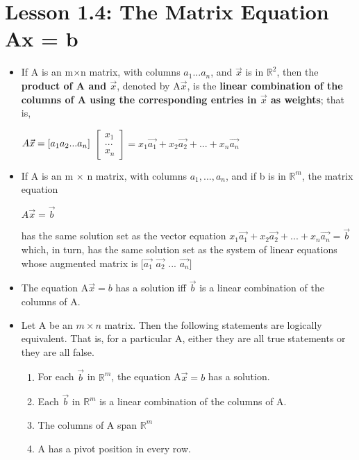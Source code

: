 \documentclass{report}
\begin{document}
\section{Lesson 1.4: The Matrix Equation Ax = b}
	\begin{itemize}\addtolength{\leftskip}{2em}
		\item If A is an m$\times$n matrix, with columns $a_{1}...a_{n}$, and $\vec{x}$ is in $\mathbb{R}^2$, then the \textbf{product of A and $\vec{x}$}, denoted by A$\vec{x}$, is the \textbf{linear combination of the columns of A using the corresponding entries in $\vec{x}$ as  weights}; that is, \linebreak \begin{center}$A\vec{x} = [a_{1} \space a_{2} \space ... \space a_{n}]$
		$\begin{bmatrix} x_1 \\ ... \\ x_n \end{bmatrix} = x_{1}\vec{a_{1}}+x_{2}\vec{a_{2}}+...+x_{n}\vec{a_{n}}$\end{center}
		\item If A is an m $\times$ n matrix, with columns $a_{1},...,a_{n}$, and if b is in $\mathbb{R}^{m}$, the matrix equation
		\begin{center}
		$A\vec{x}=\vec{b}$
		\end{center}
		has the same solution set as the vector equation $x_{1}\vec{a_{1}}+x_{2}\vec{a_{2}}+...+x_{n}\vec{a_{n}}=\vec{b}$
		which, in turn, has the same solution set as the system of linear equations whose augmented matrix is $[\vec{a_1}$ $\vec{a_2}$ ... $\vec{a_n}]$
		\item The equation A$\vec{x}=b$ has a solution iff $\vec{b}$ is a linear combination of the columns of A.
		\item Let A be an $m\times n$ matrix. Then the following statements are logically equivalent. That is, for a particular A, either they are all true statements or they are all false.
			\begin{enumerate}\addtolength{\leftskip}{4em}
			\item For each $\vec{b}$ in $\mathbb{R}^m$, the equation A$\vec{x}=b$ has a solution.
			\item Each $\vec{b}$ in $\mathbb{R}^m$ is a linear combination of the columns of A.
			\item The columns of A span $\mathbb{R}^m$
			\item A has a pivot position in every row.
			\end{enumerate}

\end{itemize}
\end{document}
